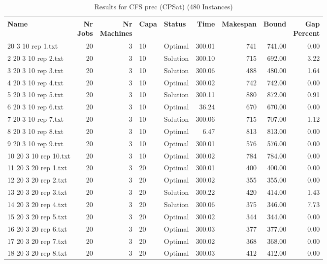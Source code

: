 \begin{longtable}{lrrllrrrr}
\caption{Results for CFS prec (CPSat) (480 Instances)}\\\toprule
Name & \shortstack{Nr\\Jobs} & \shortstack{Nr\\Machines} & Capa & Status  & Time & Makespan & Bound & \shortstack{Gap\\Percent}\\ \midrule
\endhead
\bottomrule
\endfoot
1 20 3 10 rep 1.txt & 20 & 3 & 10 & Optimal & 300.01 & 741 & 741.00 &  0.00\\
2 20 3 10 rep 2.txt & 20 & 3 & 10 & Solution & 300.10 & 715 & 692.00 &  3.22\\
3 20 3 10 rep 3.txt & 20 & 3 & 10 & Solution & 300.06 & 488 & 480.00 &  1.64\\
4 20 3 10 rep 4.txt & 20 & 3 & 10 & Optimal & 300.02 & 742 & 742.00 &  0.00\\
5 20 3 10 rep 5.txt & 20 & 3 & 10 & Solution & 300.11 & 880 & 872.00 &  0.91\\
6 20 3 10 rep 6.txt & 20 & 3 & 10 & Optimal & 36.24 & 670 & 670.00 &  0.00\\
7 20 3 10 rep 7.txt & 20 & 3 & 10 & Solution & 300.06 & 715 & 707.00 &  1.12\\
8 20 3 10 rep 8.txt & 20 & 3 & 10 & Optimal &  6.47 & 813 & 813.00 &  0.00\\
9 20 3 10 rep 9.txt & 20 & 3 & 10 & Optimal & 300.01 & 576 & 576.00 &  0.00\\
10 20 3 10 rep 10.txt & 20 & 3 & 10 & Optimal & 300.02 & 784 & 784.00 &  0.00\\
11 20 3 20 rep 1.txt & 20 & 3 & 20 & Optimal & 300.01 & 400 & 400.00 &  0.00\\
12 20 3 20 rep 2.txt & 20 & 3 & 20 & Optimal & 300.02 & 355 & 355.00 &  0.00\\
13 20 3 20 rep 3.txt & 20 & 3 & 20 & Solution & 300.22 & 420 & 414.00 &  1.43\\
14 20 3 20 rep 4.txt & 20 & 3 & 20 & Solution & 300.06 & 375 & 346.00 &  7.73\\
15 20 3 20 rep 5.txt & 20 & 3 & 20 & Optimal & 300.02 & 344 & 344.00 &  0.00\\
16 20 3 20 rep 6.txt & 20 & 3 & 20 & Optimal & 300.03 & 377 & 377.00 &  0.00\\
17 20 3 20 rep 7.txt & 20 & 3 & 20 & Optimal & 300.02 & 368 & 368.00 &  0.00\\
18 20 3 20 rep 8.txt & 20 & 3 & 20 & Optimal & 300.03 & 412 & 412.00 &  0.00\\

\end{longtable}
